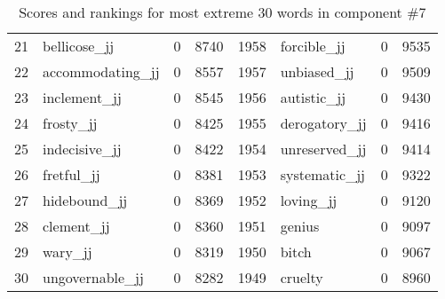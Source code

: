 \begin{table}[tbp]
\begin{tabular}{| rlr@{.}l | rlr@{.}l |}
    21 & bellicose\_jj & 0 & 8740    &    1958 & forcible\_jj & 0 & 9535 \\
    22 & accommodating\_jj & 0 & 8557    &    1957 & unbiased\_jj & 0 & 9509 \\
    23 & inclement\_jj & 0 & 8545    &    1956 & autistic\_jj & 0 & 9430 \\
    24 & frosty\_jj & 0 & 8425    &    1955 & derogatory\_jj & 0 & 9416 \\
    25 & indecisive\_jj & 0 & 8422    &    1954 & unreserved\_jj & 0 & 9414 \\
    26 & fretful\_jj & 0 & 8381    &    1953 & systematic\_jj & 0 & 9322 \\
    27 & hidebound\_jj & 0 & 8369    &    1952 & loving\_jj & 0 & 9120 \\
    28 & clement\_jj & 0 & 8360    &    1951 & genius & 0 & 9097 \\
    29 & wary\_jj & 0 & 8319    &    1950 & bitch & 0 & 9067 \\
    30 & ungovernable\_jj & 0 & 8282    &    1949 & cruelty & 0 & 8960 \\
    \hline
    \end{tabular}
    \caption{Scores and rankings for most extreme 30 words in component \#7} 
\end{table}
\clearpage
